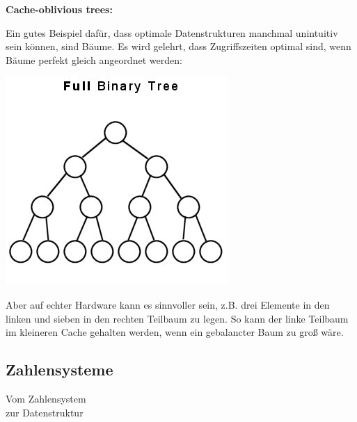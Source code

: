 \documentclass{beamer}
\begin{document}
\begin{frame}
\textbf{Cache-oblivious trees:}

Ein gutes Beispiel dafür, dass optimale Datenstrukturen manchmal unintuitiv sein können, sind Bäume. Es wird gelehrt, dass Zugriffszeiten optimal sind, wenn Bäume perfekt gleich angeordnet werden:

\begin{multicols}{2}

\includegraphics[scale=0.35]{FullBinary.jpg} 

\columnbreak
\pause

Aber auf echter Hardware kann es sinnvoller sein, z.B. drei Elemente in den linken und sieben in den rechten Teilbaum zu legen. So kann der linke Teilbaum im kleineren Cache gehalten werden, wenn ein gebalancter Baum zu groß wäre.

\end{multicols}
\end{frame}

\subsection{Zahlensysteme}

\begin{frame}
\Large
\begin{center}
Vom Zahlensystem\\
zur Datenstruktur
\end{center}
\normalsize
\end{frame}

\end{document}
